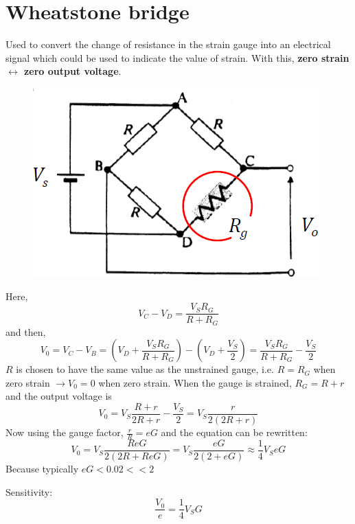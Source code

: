 \documentclass[class=report, crop=false, 12pt,a4paper, tikz, border=4mm]{standalone}
\begin{document}
\section{Wheatstone bridge}
Used to convert the change of resistance in the strain gauge into an electrical signal which could be used to indicate the value of strain. With this, \textbf{zero strain $\leftrightarrow$ zero output voltage}.
\begin{figure}[H]
  \centering
  \includegraphics[width = 0.6 \textwidth]{../img/diagram12.png}
\end{figure}
Here, 
\begin{equation}
  V_C - V_D = \frac{V_S R_G}{R + R_G}
\end{equation}
and then,
\begin{equation}
  V_0 = V_C - V_B = \left( V_D + \frac{V_S R_G}{R + R_G} \right) - \left( V_D + \frac{V_S}{2} \right) = \frac{V_S R_G}{R + R_G} - \frac{V_S}{2}
\end{equation}
$R$ is chosen to have the same value as the unstrained gauge, i.e. $R = R_G$ when zero strain $\rightarrow V_0 = 0$ when zero strain. When the gauge is strained, $R_G = R + r$ and the output voltage is
\begin{equation}
  V_0 = V_S \frac{R + r}{2R + r} - \frac{V_S}{2} = V_S \frac{r}{2(2R +r)}
\end{equation}
Now using the gauge factor, $\frac{r}{R} = eG$ and the equation can be rewritten: 
\begin{equation}
  V_0 = V_S \frac{ReG}{2(2R + ReG)} = V_S\frac{eG}{2(2+eG)} \approx \frac{1}{4} V_S eG
\end{equation}
Because typically $eG < 0.02 << 2$

Sensitivity:
\begin{equation}
  \frac{V_0}{e} = \frac{1}{4} V_S G
\end{equation}
\end{document}
